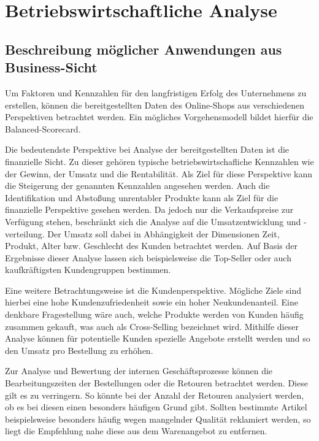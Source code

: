 \section{Betriebswirtschaftliche Analyse}
\subsection{Beschreibung möglicher Anwendungen aus Business-Sicht}

Um Faktoren und Kennzahlen für den langfristigen Erfolg des Unternehmens zu erstellen, können die bereitgestellten Daten des Online-Shops aus verschiedenen Perspektiven betrachtet werden. Ein mögliches Vorgehensmodell bildet hierfür die Balanced-Scorecard.

Die bedeutendste Perspektive bei Analyse der bereitgestellten Daten ist die finanzielle Sicht. Zu dieser gehören typische betriebswirtschafliche Kennzahlen wie der Gewinn, der Umsatz und die Rentabilität. Als Ziel für diese Perspektive kann die Steigerung der genannten Kennzahlen angesehen werden. Auch die Identifikation und Abstoßung unrentabler Produkte kann als Ziel für die finanzielle Perspektive gesehen werden. Da jedoch nur die Verkaufspreise zur Verfügung stehen, beschränkt sich die Analyse auf die Umsatzentwicklung und -verteilung. Der Umsatz soll dabei in Abhängigkeit der Dimensionen Zeit, Produkt, Alter bzw. Geschlecht des Kunden betrachtet werden. Auf Basis der Ergebnisse dieser Analyse lassen sich beispielsweise die Top-Seller oder auch kaufkräftigsten Kundengruppen bestimmen.

Eine weitere Betrachtungsweise ist die Kundenperspektive. Mögliche Ziele sind hierbei eine hohe Kundenzufriedenheit sowie ein hoher Neukundenanteil. Eine denkbare Fragestellung wäre auch, welche Produkte werden von Kunden häufig zusammen gekauft, was auch als Cross-Selling bezeichnet wird. Mithilfe dieser Analyse können für potentielle Kunden spezielle Angebote erstellt werden und so den Umsatz pro Bestellung zu erhöhen.

Zur Analyse und Bewertung der internen Geschäftsprozesse können die Bearbeitungszeiten der Bestellungen oder die Retouren betrachtet werden. Diese gilt es zu verringern.
So könnte bei der Anzahl der Retouren analysiert werden, ob es bei diesen einen besonders häufigen Grund gibt. Sollten bestimmte Artikel beispielsweise besonders häufig wegen mangelnder Qualität reklamiert werden, so liegt die Empfehlung nahe diese aus dem Warenangebot zu entfernen.

